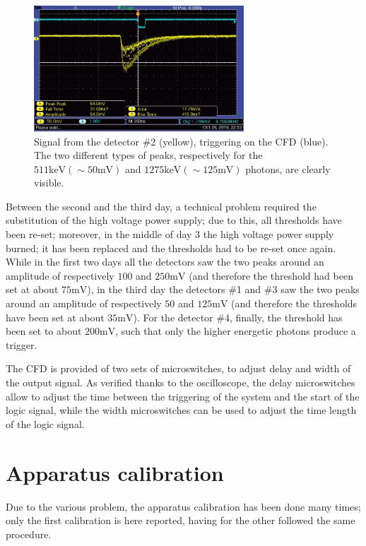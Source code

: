 \documentclass[11pt,a4 paper]{article}
\begin{document}
\begin{figure}[H]
    \centering
    \includegraphics[width=0.7\textwidth]{img/TEK0001.JPG}
    \caption{Signal from the detector \#2 (yellow), triggering on the CFD (blue). The two different types of peaks, respectively for the $511\si{\kilo\electronvolt} (\sim 50\si{\milli\volt})$ and $1275\si{\kilo\electronvolt} (\sim 125\si{\milli\volt})$ photons, are clearly visible.}
    \label{fig:oscilloscope}
\end{figure}

Between the second and the third day, a technical problem required the substitution of the high voltage power supply; due to this, all thresholds have been re-set; moreover, in the middle of day 3 the high voltage power supply burned; it has been replaced and the thresholds had to be re-set once again. While in the first two days all the detectors saw the two peaks around an amplitude of respectively $100$ and $250\si{\milli\volt}$ (and therefore the threshold had been set at about $75\si{\milli\volt}$), in the third day the detectors \#1 and \#3 saw the two peaks around an amplitude of respectively $50$ and $125\si{\milli\volt}$ (and therefore the thresholds have been set at about $35\si{\milli\volt}$). For the detector \#4, finally, the threshold has been set to about $200\si{\milli\volt}$, such that only the higher energetic photons produce a trigger.

The CFD is provided of two sets of microswitches, to adjust delay and width of the output signal. As verified thanks to the oscilloscope, the delay microswitches allow to adjust the time between the triggering of the system and the start of the logic signal, while the width microswitches can be used to adjust the time length of the logic signal.



\section{Apparatus calibration}
Due to the various problem, the apparatus calibration has been done many times; only the first calibration is here reported, having for the other followed the same procedure.
\end{document}
